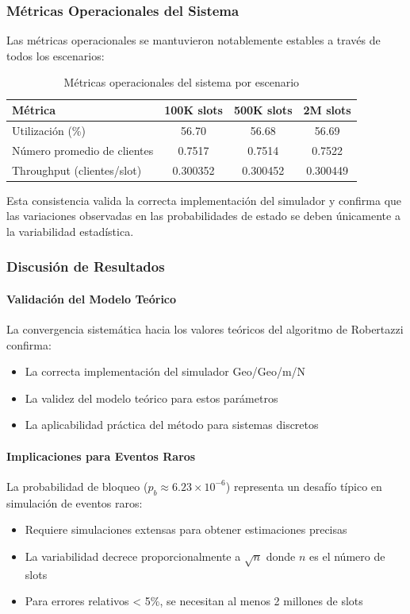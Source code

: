\documentclass{article}
\begin{document}
\subsubsection{Métricas Operacionales del Sistema}
Las métricas operacionales se mantuvieron notablemente estables a través de todos los escenarios:
\begin{table}[H]
    \centering
    \caption{Métricas operacionales del sistema por escenario}
    \begin{tabular}{|l|c|c|c|}
        \hline
        \textbf{Métrica} & \textbf{100K slots} & \textbf{500K slots} & \textbf{2M slots} \\
        \hline
        Utilización (\%) & 56.70 & 56.68 & 56.69 \\
        Número promedio de clientes & 0.7517 & 0.7514 & 0.7522 \\
        Throughput (clientes/slot) & 0.300352 & 0.300452 & 0.300449 \\
        \hline
    \end{tabular}
\end{table}
Esta consistencia valida la correcta implementación del simulador y confirma que las variaciones observadas en las probabilidades de estado se deben únicamente a la variabilidad estadística.

\subsubsection{Discusión de Resultados}

\paragraph{Validación del Modelo Teórico}
La convergencia sistemática hacia los valores teóricos del algoritmo de Robertazzi confirma:
\begin{itemize}
    \item La correcta implementación del simulador Geo/Geo/m/N
    \item La validez del modelo teórico para estos parámetros
    \item La aplicabilidad práctica del método para sistemas discretos
\end{itemize}

\paragraph{Implicaciones para Eventos Raros}
La probabilidad de bloqueo ($p_b \approx 6.23 \times 10^{-6}$) representa un desafío típico en simulación de eventos raros:
\begin{itemize}
    \item Requiere simulaciones extensas para obtener estimaciones precisas
    \item La variabilidad decrece proporcionalmente a $\sqrt{n}$ donde $n$ es el número de slots
    \item Para errores relativos < 5\%, se necesitan al menos 2 millones de slots
\end{itemize}
\end{document}
